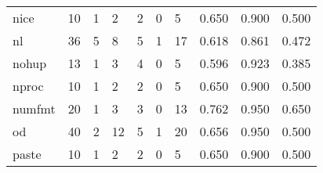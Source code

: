 \begin{longtable}{lp{1.3cm}p{1.3cm}p{1.3cm}p{1.3cm}p{1.3cm}p{1.3cm}p{1.3cm}p{1.3cm}p{1.3cm}}
nice      &                     10 &                                             1 &                                            2 &                                           2 &                                            0 &                                          5 &                                0.650 &                                  0.900 &                                0.500 \\
nl        &                     36 &                                             5 &                                            8 &                                           5 &                                            1 &                                         17 &                                0.618 &                                  0.861 &                                0.472 \\
nohup     &                     13 &                                             1 &                                            3 &                                           4 &                                            0 &                                          5 &                                0.596 &                                  0.923 &                                0.385 \\
nproc     &                     10 &                                             1 &                                            2 &                                           2 &                                            0 &                                          5 &                                0.650 &                                  0.900 &                                0.500 \\
numfmt    &                     20 &                                             1 &                                            3 &                                           3 &                                            0 &                                         13 &                                0.762 &                                  0.950 &                                0.650 \\
od        &                     40 &                                             2 &                                           12 &                                           5 &                                            1 &                                         20 &                                0.656 &                                  0.950 &                                0.500 \\
paste     &                     10 &                                             1 &                                            2 &                                           2 &                                            0 &                                          5 &                                0.650 &                                  0.900 &                                0.500 \\

\end{longtable}
